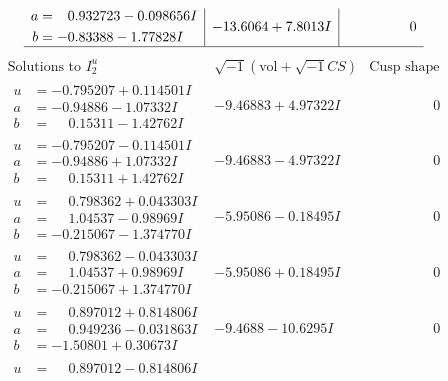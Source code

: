\documentclass[1p]{elsarticle_modified}
\theoremstyle{definition}
\newcommand{\I}{\sqrt{-1}}
\begin{document}
$$\begin{array}{c|c|c}
\begin{aligned}
a &= \phantom{-}0.932723 - 0.098656 I \\
b &= -0.83388 - 1.77828 I\end{aligned}
 & -13.6064 + 7.8013 I & \phantom{-0.000000 } 0\\
 \hline 
 \end{array}$$\newpage$$\begin{array}{c|c|c}  
\text{Solutions to }I^u_{2}& \I (\text{vol} + \sqrt{-1}CS) & \text{Cusp shape}\\
 \hline 
\begin{aligned}
u &= -0.795207 + 0.114501 I \\
a &= -0.94886 - 1.07332 I \\
b &= \phantom{-}0.15311 - 1.42762 I\end{aligned}
 & -9.46883 + 4.97322 I & \phantom{-0.000000 } 0 \\ \hline\begin{aligned}
u &= -0.795207 - 0.114501 I \\
a &= -0.94886 + 1.07332 I \\
b &= \phantom{-}0.15311 + 1.42762 I\end{aligned}
 & -9.46883 - 4.97322 I & \phantom{-0.000000 } 0 \\ \hline\begin{aligned}
u &= \phantom{-}0.798362 + 0.043303 I \\
a &= \phantom{-}1.04537 - 0.98969 I \\
b &= -0.215067 - 1.374770 I\end{aligned}
 & -5.95086 - 0.18495 I & \phantom{-0.000000 } 0 \\ \hline\begin{aligned}
u &= \phantom{-}0.798362 - 0.043303 I \\
a &= \phantom{-}1.04537 + 0.98969 I \\
b &= -0.215067 + 1.374770 I\end{aligned}
 & -5.95086 + 0.18495 I & \phantom{-0.000000 } 0 \\ \hline\begin{aligned}
u &= \phantom{-}0.897012 + 0.814806 I \\
a &= \phantom{-}0.949236 - 0.031863 I \\
b &= -1.50801 + 0.30673 I\end{aligned}
 & -9.4688 - 10.6295 I & \phantom{-0.000000 } 0 \\ \hline\begin{aligned}
u &= \phantom{-}0.897012 - 0.814806 I \\

\end{aligned}
\end{array}$$
\end{document}
